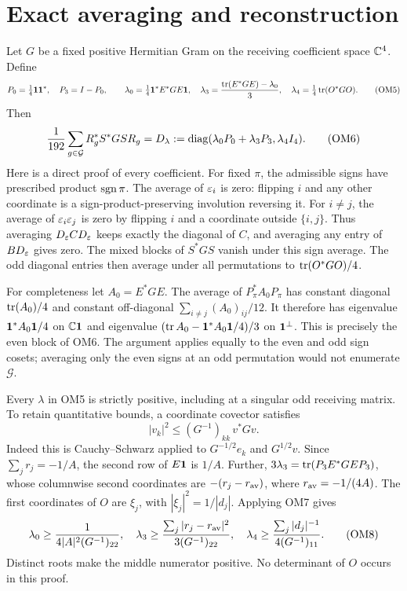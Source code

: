 \section{Exact averaging and reconstruction}
Let $G$ be a fixed positive Hermitian Gram on the receiving coefficient
space $\mathbb C^4$.  Define
\[
P_0=\tfrac14\mathbf 1\mathbf 1^*,\quad P_3=I-P_0,\qquad
\lambda_0=\tfrac14\mathbf 1^*E^*GE\mathbf 1,\quad
\lambda_3=\frac{\operatorname{tr}(E^*GE)-\lambda_0}{3},\quad
\lambda_4=\tfrac14\operatorname{tr}(O^*GO).
\tag{OM5}
\]
Then
\[
\frac1{192}\sum_{g\in\mathcal G}R_g^*S^*GS R_g
=D_\lambda:=
\operatorname{diag}(\lambda_0P_0+\lambda_3P_3,\lambda_4I_4).
\tag{OM6}
\]
Here is a direct proof of every coefficient.  For fixed $\pi$, the
admissible signs have prescribed product $\operatorname{sgn}\pi$.  The average of
$\varepsilon_i$ is zero: flipping $i$ and any other coordinate is a
sign-product-preserving involution reversing it.  For $i\ne j$,
the average of $\varepsilon_i\varepsilon_j$ is zero by flipping $i$ and a coordinate
outside $\{i,j\}$.  Thus averaging $D_\varepsilon C D_\varepsilon$ keeps exactly
the diagonal of $C$, and averaging any entry of $B D_\varepsilon$ gives
zero.  The mixed blocks of $S^*GS$ vanish under this sign average.
The odd diagonal entries then average under all permutations to
$\operatorname{tr}(O^*GO)/4$.

For completeness let $A_0=E^*GE$.  The average of $P_\pi^*A_0P_\pi$
has constant diagonal $\operatorname{tr}(A_0)/4$ and constant off-diagonal
$\sum_{i\ne j}(A_0)_{ij}/12$.  It therefore has eigenvalue
$\mathbf 1^*A_0\mathbf 1/4$ on $\mathbb C\mathbf 1$ and eigenvalue
$(\operatorname{tr} A_0-\mathbf 1^*A_0\mathbf 1/4)/3$ on $\mathbf 1^\perp$.
This is precisely the even block of OM6.  The argument applies
equally to the even and odd sign cosets; averaging only the
even signs at an odd permutation would not enumerate $\mathcal G$.

Every $\lambda$ in OM5 is strictly positive, including at a singular
odd receiving matrix.  To retain quantitative bounds, a coordinate
covector satisfies
\[
|v_k|^2\le (G^{-1})_{kk}\,v^*Gv.
\tag{OM7}
\]
Indeed this is Cauchy--Schwarz applied to $G^{-1/2}e_k$ and
$G^{1/2}v$.  Since $\sum_jr_j=-1/A$, the second row of $E\mathbf 1$
is $1/A$.  Further,
$3\lambda_3=\operatorname{tr}(P_3E^*GE P_3)$, whose columnwise second coordinates
are $-(r_j-r_{\rm av})$, where $r_{\rm av}=-1/(4A)$.
The first coordinates of $O$ are $\xi_j$, with
$|\xi_j|^2=1/|d_j|$.  Applying OM7 gives
\[
\lambda_0\ge\frac1{4|A|^2(G^{-1})_{22}},\quad
\lambda_3\ge
\frac{\sum_j|r_j-r_{\rm av}|^2}{3(G^{-1})_{22}},\quad
\lambda_4\ge\frac{\sum_j|d_j|^{-1}}{4(G^{-1})_{11}}.
\tag{OM8}
\]
Distinct roots make the middle numerator positive.  No determinant
of $O$ occurs in this proof.


